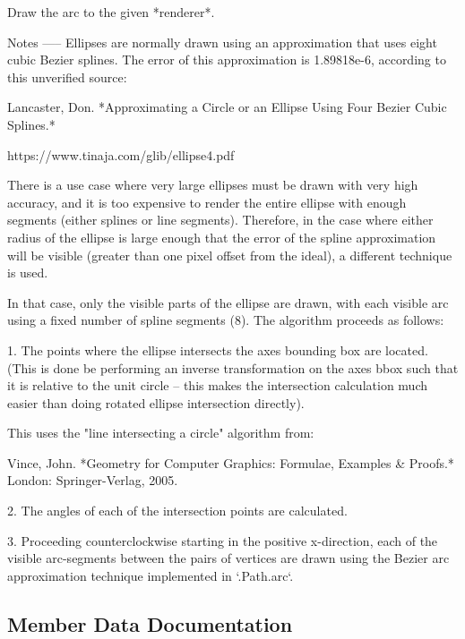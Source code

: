 \begin{DoxyVerb}Draw the arc to the given *renderer*.

Notes
-----
Ellipses are normally drawn using an approximation that uses
eight cubic Bezier splines.  The error of this approximation
is 1.89818e-6, according to this unverified source:

  Lancaster, Don.  *Approximating a Circle or an Ellipse Using
  Four Bezier Cubic Splines.*

  https://www.tinaja.com/glib/ellipse4.pdf

There is a use case where very large ellipses must be drawn
with very high accuracy, and it is too expensive to render the
entire ellipse with enough segments (either splines or line
segments).  Therefore, in the case where either radius of the
ellipse is large enough that the error of the spline
approximation will be visible (greater than one pixel offset
from the ideal), a different technique is used.

In that case, only the visible parts of the ellipse are drawn,
with each visible arc using a fixed number of spline segments
(8).  The algorithm proceeds as follows:

1. The points where the ellipse intersects the axes bounding
   box are located.  (This is done be performing an inverse
   transformation on the axes bbox such that it is relative
   to the unit circle -- this makes the intersection
   calculation much easier than doing rotated ellipse
   intersection directly).

   This uses the "line intersecting a circle" algorithm from:

       Vince, John.  *Geometry for Computer Graphics: Formulae,
       Examples & Proofs.*  London: Springer-Verlag, 2005.

2. The angles of each of the intersection points are calculated.

3. Proceeding counterclockwise starting in the positive
   x-direction, each of the visible arc-segments between the
   pairs of vertices are drawn using the Bezier arc
   approximation technique implemented in `.Path.arc`.
\end{DoxyVerb}
 

\subsection{Member Data Documentation}
\mbox{\label{classmatplotlib_1_1patches_1_1Arc_afedb04eda7b2c8b3d9faca286376e941}} 
